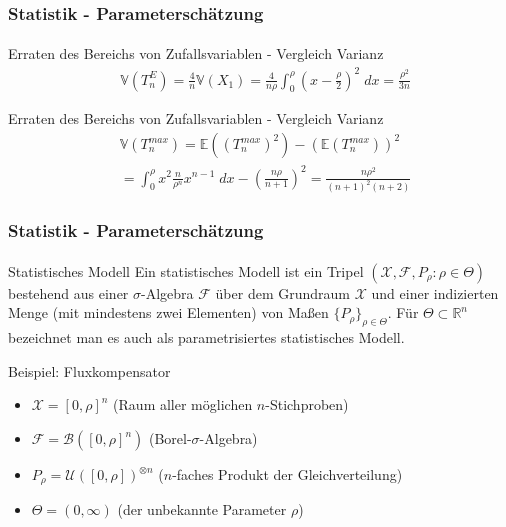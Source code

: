 \documentclass{beamer}
\begin{document}
\begin{frame}
    \frametitle{Statistik - Parameterschätzung}
\framesubtitle{}

\begin{block}{Erraten des Bereichs von Zufallsvariablen - Vergleich Varianz}
\begin{align*}
& \mathbb{V}(T_n^{E} ) = \frac{4}{n} \mathbb{V}(X_1)   =  \frac{4}{n \rho}   \int_{0}^{\rho } (x - \frac{\rho}{2})^2 \; dx = \frac{\rho^2}{3n}
\end{align*}
\end{block}
\begin{block}{Erraten des Bereichs von Zufallsvariablen - Vergleich Varianz}
\begin{align*}
& \mathbb{V}(T_n^{max} ) = \mathbb{E}((T_n^{max})^2 ) - (\mathbb{E}(T_n^{max} ))^2   \\
& = \int_{0}^{\rho} x^2 \frac{n}{\rho^n} x^{n- 1} \; dx - (\frac{n \rho}{n+1})^2 = \frac{n \rho^2}{(n+1)^2 (n+2)} 
\end{align*}
\end{block}
 \end{frame}








\begin{frame}
    \frametitle{Statistik - Parameterschätzung}
\framesubtitle{}

\begin{block}{Statistisches Modell}
Ein statistisches Modell ist ein Tripel $(\mathcal{X}, \mathcal{F}, P_\rho :  \rho \in \Theta)$ bestehend aus einer $\sigma$-Algebra $\mathcal{F}$ über dem Grundraum $\mathcal{X}$ und einer indizierten Menge (mit mindestens zwei Elementen) von Maßen $\{ P_\rho\}_{\rho \in \Theta}$. Für $\Theta \subset \mathbb{R}^n$ bezeichnet man es auch als parametrisiertes statistisches Modell. 
\end{block}

\begin{block}{Beispiel: Fluxkompensator}
\begin{itemize}
\item $\mathcal{X} = [0, \rho]^n$ (Raum aller möglichen $n$-Stichproben)
\item $\mathcal{F} = \mathcal{B}([0,\rho]^n)$ (Borel-$\sigma$-Algebra)
\item $P_\rho = \mathcal{U}([0,\rho])^{\otimes n}$ ($n$-faches Produkt der Gleichverteilung)
\item $\Theta = (0, \infty)$ (der unbekannte Parameter $\rho$)
\end{itemize}
\end{block}
 \end{frame}
\end{document}

